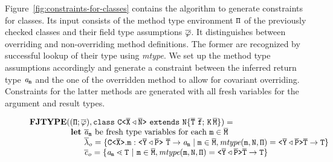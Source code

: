 \documentclass[a4paper,USenglish,cleveref, autoref, thm-restate]{lipics-v2021}
\begin{document}
Figure~\ref{fig:constraints-for-classes} contains the algorithm
{\fjtype} to generate constraints for classes. Its input
consists of the method type environment ${\tt \Pi}$ of the previously
checked classes and their field type assumptions
$\overline{\tt \mathtt{\varphi}{}}$. It distinguishes between overriding and
non-overriding method definitions. The former are recognized by
successful lookup of their type using \textit{mtype}. We set up the
method type assumptions accordingly and generate a constraint between
the inferred return type $\mathit{ a }_{{\tt m}}$ and the one of the
overridden method to allow for covariant overriding.
Constraints for the latter methods are generated with all fresh
variables for the argument and result types.

\begin{figure}[tp]
  \begin{gather*}
    \begin{array}{@{}l@{}l}
      \fjtype & ({(\mv{\Pi} ; \overline{\fieldAssumption})}, \mathtt{class } \ \exptype{C}{\ol{X} \triangleleft \ol{N}} \ \mathtt{ extends } \ \mathtt{N \{ \overline{T} \ \overline{f}; \, K \, \overline{M} \}}) =\\
              & \begin{array}{l@{}l@{}l}
                  \textbf{let} &\ \overline{\tv{a}}_{\mv m} \text{ be fresh type variables
                                 for each }\mv{m}\in\ol{M} \\
                               &\ \ol{\methodAssumption}_o = \set{\exptype{C}{\ol{X}}.\mv{m} :
                                 \exptype{}{\ol{Y} \triangleleft \ol{P}}\ \ol{T} \to \tv{a}_{\mv m} \mid \mv{m} \in \ol{M},
                                 \textit{mtype}(\mv{m}, \type{N}, \mv\Pi) = \exptype{}{\ol{Y} \triangleleft \ol{P}} \ol{\type{T}} \to \type{T}}\\
                               &\ \constraints_o = \set{\tv{a}_{\mv m} \lessdot \type{T} \ |\ \texttt{m} \in \ol{M}, 
                                 \textit{mtype}(\mv{m}, \mv{N}, \mv\Pi) = \exptype{}{\ol{Y} \triangleleft \ol{P}} \ol{\type{T}} \to \type{T}}\\

\end{array}
\end{array}
\end{gather*}
\end{figure}
\end{document}
